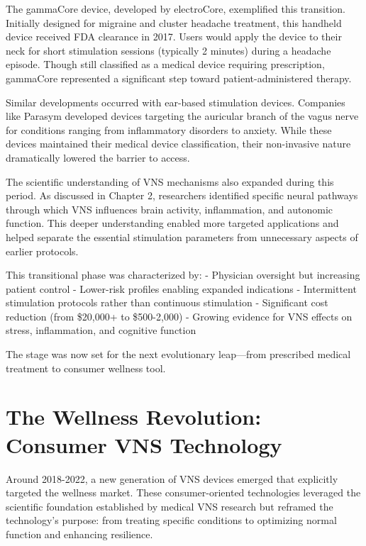 \documentclass[
  Letterpaper,
]{scrbook}
\begin{document}
The gammaCore device, developed by electroCore, exemplified this
transition. Initially designed for migraine and cluster headache
treatment, this handheld device received FDA clearance in 2017. Users
would apply the device to their neck for short stimulation sessions
(typically 2 minutes) during a headache episode. Though still classified
as a medical device requiring prescription, gammaCore represented a
significant step toward patient-administered therapy.

Similar developments occurred with ear-based stimulation devices.
Companies like Parasym developed devices targeting the auricular branch
of the vagus nerve for conditions ranging from inflammatory disorders to
anxiety. While these devices maintained their medical device
classification, their non-invasive nature dramatically lowered the
barrier to access.

The scientific understanding of VNS mechanisms also expanded during this
period. As discussed in Chapter 2, researchers identified specific
neural pathways through which VNS influences brain activity,
inflammation, and autonomic function. This deeper understanding enabled
more targeted applications and helped separate the essential stimulation
parameters from unnecessary aspects of earlier protocols.

This transitional phase was characterized by: - Physician oversight but
increasing patient control - Lower-risk profiles enabling expanded
indications - Intermittent stimulation protocols rather than continuous
stimulation - Significant cost reduction (from \$20,000+ to \$500-2,000)
- Growing evidence for VNS effects on stress, inflammation, and
cognitive function

The stage was now set for the next evolutionary leap---from prescribed
medical treatment to consumer wellness tool.

\section{The Wellness Revolution: Consumer VNS
Technology}\label{the-wellness-revolution-consumer-vns-technology}

Around 2018-2022, a new generation of VNS devices emerged that
explicitly targeted the wellness market. These consumer-oriented
technologies leveraged the scientific foundation established by medical
VNS research but reframed the technology's purpose: from treating
specific conditions to optimizing normal function and enhancing
resilience.
\end{document}
